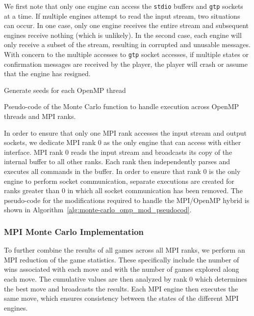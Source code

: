 \documentclass[nocopyrightspace, 10pt]{sigplanconf}
\begin{document}
We first note that only one engine can access the \texttt{stdio} buffers and \texttt{gtp} sockets at a time.  If multiple engines attempt to read the input stream, two situations can occur.  In one case, only one engine receives the entire stream and subsequent engines receive nothing (which is unlikely).  In the second case, each engine will only receive a subset of the stream, resulting in corrupted and unusable messages.  With concern to the multiple accesses to \texttt{gtp} socket accesses, if multiple states or confirmation messages are received by the player, the player will crash or assume that the engine has resigned. 


\begin{algorithm}
    Generate seeds for each OpenMP thread\;
 \caption{Pseudo-code of the Monte Carlo function to handle execution across OpenMP threads and MPI ranks.}
 \label{alg:monte-carlo_omp_mod_pseudocod}
\end{algorithm}

In order to ensure that only one MPI rank accesses the input stream and output sockets, we dedicate MPI rank 0 as the only engine that can access with either interface.  MPI rank 0 reads the input stream and broadcasts its copy of the internal buffer to all other ranks.  Each rank then independently parses and executes all commands in the buffer.  In order to ensure that rank 0 is the only engine to perform socket communication, separate executions are created for ranks greater than 0 in which all socket communication has been removed.  The pseudo-code for the modifications required to handle the MPI/OpenMP hybrid is shown in Algorithm~\ref{alg:monte-carlo_omp_mod_pseudocod}.

\subsubsection{MPI Monte Carlo Implementation}

To further combine the results of all games across all MPI ranks, we perform an MPI reduction of the game statistics.  These specifically include the number of wins associated with each move and with the number of games explored along each move. The cumulative values are then analyzed by rank 0 which determines the best move and broadcasts the results.  Each MPI engine then executes the same move, which ensures consistency between the states of the different MPI engines.  
\end{document}
